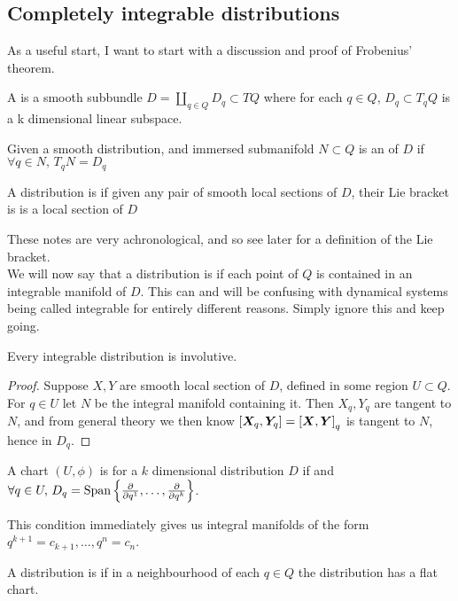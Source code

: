 \documentclass{article}
\begin{document}
\subsection{Completely integrable distributions}
As a useful start, I want to start with a discussion and proof of Frobenius' theorem.

\begin{definition}
A  is a smooth subbundle $D = \coprod_{q \in Q} D_q \subset TQ$ where for each $q \in Q$, $D_q \subset T_qQ$ is a k dimensional linear subspace. 
\end{definition}


\begin{definition}
Given a  smooth distribution, and immersed submanifold $N \subset Q$ is an  of $D$ if $\forall q \in N, \, T_qN = D_q$ 
\end{definition}

\begin{definition}
A distribution is  if given any pair of smooth local sections of $D$, their Lie bracket is is a local section of $D$
\end{definition}

These notes are very achronological, and so see later for a definition of the Lie bracket. \\
We will now say that a distribution is  if each point of $Q$ is contained in an integrable manifold of $D$. This can and will be confusing with dynamical systems being called integrable for entirely different reasons. Simply ignore this and keep going. 

\begin{prop}
Every integrable distribution is involutive. 
\end{prop}
\begin{proof}
Suppose $X,Y$ are smooth local section of $D$, defined in some region $U \subset Q$. For $q \in U $ let $N$ be the integral manifold containing it. Then $X_q,Y_q$ are tangent to $N$, and from general theory we then know $\comm[\bm{X}_q]{\bm{Y}_q} = \comm[\bm{X}]{\bm{Y}}_q$ is tangent to $N$, hence in $D_q$. 
\end{proof}

\begin{definition}
A chart $(U,\phi)$ is  for a $k$ dimensional distribution $D$ if 
and $\forall q \in U, \, D_q = \spn\pbrace{\pd{q^1}, \dots, \pd{q^k} }$.
\end{definition}
This condition immediately gives us integral manifolds of the form $q^{k+1} = c_{k+1}, \dots, q^n = c_n$. 
\begin{definition}
A distribution is  if in a neighbourhood of each $q\in Q$ the distribution has a flat chart. 
\end{definition}
\end{document}
